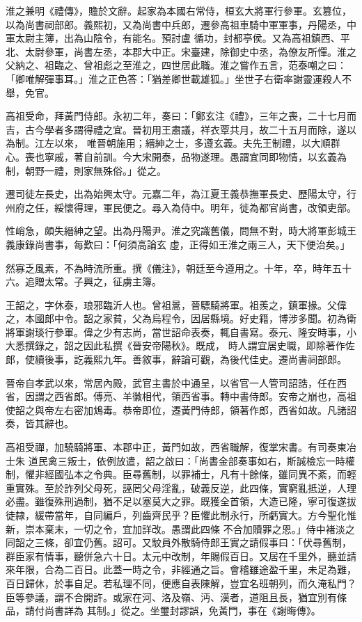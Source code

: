\begin{pinyinscope}
 淮之兼明《禮傳》，贍於文辭。起家為本國右常侍，桓玄大將軍行參軍。玄篡位，以為尚書祠部郎。義熙初，又為尚書中兵郎，遷參高祖車騎中軍軍事，丹陽丞，中軍太尉主簿，出為山陰令，有能名。預討盧
 循功，封都亭侯。又為高祖鎮西、平北、太尉參軍，尚書左丞，本郡大中正。宋臺建，除御史中丞，為僚友所憚。淮之父納之、祖臨之、曾祖彪之至淮之，四世居此職。淮之嘗作五言，范泰嘲之曰：「卿唯解彈事耳。」淮之正色答：「猶差卿世載雄狐。」坐世子右衛率謝靈運殺人不舉，免官。



 高祖受命，拜黃門侍郎。永初二年，奏曰：「鄭玄注《禮》，三年之喪，二十七月而吉，古今學者多謂得禮之宜。晉初用王肅議，祥衣覃共月，故二十五月而除，遂以為制。江左以來，
 唯晉朝施用；縉紳之士，多遵玄義。夫先王制禮，以大順群心。喪也寧戚，著自前訓。今大宋開泰，品物遂理。愚謂宜同即物情，以玄義為制，朝野一禮，則家無殊俗。」從之。



 遷司徒左長史，出為始興太守。元嘉二年，為江夏王義恭撫軍長史、歷陽太守，行州府之任，綏懷得理，軍民便之。尋入為侍中。明年，徙為都官尚書，改領吏部。



 性峭急，頗失縉紳之望。出為丹陽尹。淮之究識舊儀，問無不對，時大將軍彭城王義康錄尚書事，每歎曰：「何須高論玄
 虛，正得如王淮之兩三人，天下便治矣。」



 然寡乏風素，不為時流所重。撰《儀注》，朝廷至今遵用之。十年，卒，時年五十六。追贈太常。子興之，征虜主簿。



 王韶之，字休泰，琅邪臨沂人也。曾祖暠，晉驃騎將軍。祖羨之，鎮軍掾。父偉之，本國郎中令。韶之家貧，父為烏程令，因居縣境。好史籍，博涉多聞。初為衛將軍謝琰行參軍。偉之少有志尚，當世詔命表奏，輒自書寫。泰元、隆安時事，小大悉撰錄之，韶之因此私撰《晉安帝陽秋》。既成，
 時人謂宜居史職，即除著作佐郎，使續後事，訖義熙九年。善敘事，辭論可觀，為後代佳史。遷尚書祠部郎。



 晉帝自孝武以來，常居內殿，武官主書於中通呈，以省官一人管司詔誥，任在西省，因謂之西省郎。傅亮、羊徽相代，領西省事。轉中書侍郎。安帝之崩也，高祖使韶之與帝左右密加鴆毒。恭帝即位，遷黃門侍郎，領著作郎，西省如故。凡諸詔奏，皆其辭也。



 高祖受禪，加驍騎將軍、本郡中正，黃門如故，西省職解，復掌宋書。有司奏東冶士朱
 道民禽三叛士，依例放遣，韶之啟曰：「尚書金部奏事如右，斯誠檢忘一時權制，懼非經國弘本之令典。臣尋舊制，以罪補士，凡有十餘條，雖同異不紊，而輕重實殊。至於詐列父母死，誣罔父母淫亂，破義反逆，此四條，實窮亂抵逆，人理必盡。雖復殊刑過制，猶不足以塞莫大之罪。既獲全首領，大造已隆，寧可復遂拔徒隸，緩帶當年，自同編戶，列齒齊民乎？臣懼此制永行，所虧實大。方今聖化惟新，崇本棄末，一切之令，宜加詳改。愚謂此四條
 不合加贖罪之恩。」侍中褚淡之同韶之三條，卻宜仍舊。詔可。又駮員外散騎侍郎王實之請假事曰：「伏尋舊制，群臣家有情事，聽併急六十日。太元中改制，年賜假百日。又居在千里外，聽並請來年限，合為二百日。此蓋一時之令，非經通之旨。會稽雖途盈千里，未足為難，百日歸休，於事自足。若私理不同，便應自表陳解，豈宜名班朝列，而久淹私門？臣等參議，謂不合開許。或家在河、洛及嶺、沔、漢者，道阻且長，猶宜別有條品，請付尚書詳為
 其制。」從之。坐璽封謬誤，免黃門，事在《謝晦傳》。




\end{pinyinscope}
